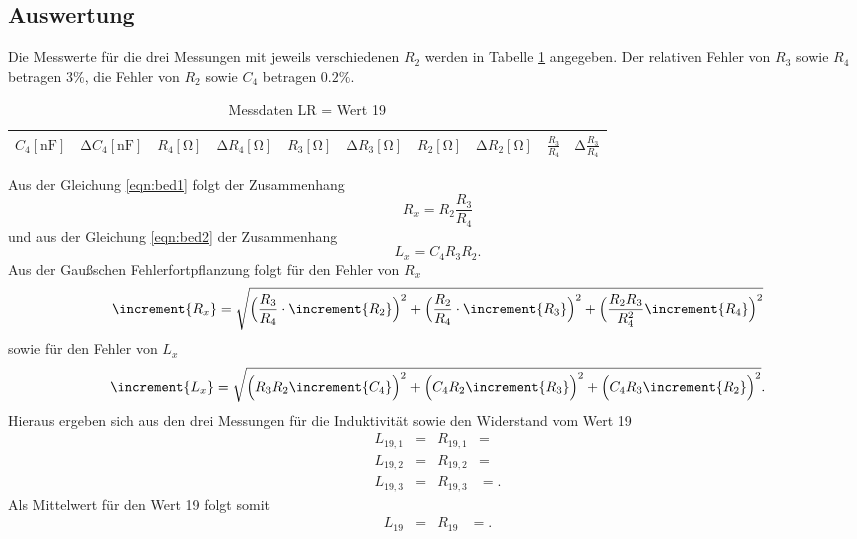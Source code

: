 \subsection{Auswertung}
Die Messwerte für die drei Messungen mit jeweils verschiedenen $R_2$ werden in Tabelle \ref{tab:7} angegeben.
Der relativen Fehler von $R_3$ sowie $R_4$ betragen $3\%$, die Fehler von $R_2$ sowie $C_4$ betragen $0.2\%$. \cite{sample}
\begin{table}
  \centering
  \caption{Messdaten LR = Wert 19}
  \label{tab:7}
  \begin{tabular}{c c c c c c c c c c}
    \toprule
    {$C_4 [\si{\nano\farad}]$} & {$\increment C_4 [\si{\nano\farad}]$} & {$R_4 [\si{\ohm}]$} & {$\increment R_4 [\si{\ohm}]$} & {$R_3 [\si{\ohm}]$} & {$\increment R_3 [\si{\ohm}]$} & {$R_2 [\si{\ohm}]$} & {$\increment R_2 [\si{\ohm}]$} & {$\frac{R_3}{R_4}$} & {$\increment \frac{R_3}{R_4}$} \\
    \midrule
    
    \bottomrule
  \end{tabular}
\end{table}
Aus der Gleichung \ref{eqn:bed1} folgt der Zusammenhang
\begin{equation}
  R_x = R_2 \frac{R_3}{R_4}
\end{equation}
und aus der Gleichung \ref{eqn:bed2} der Zusammenhang
\begin{equation}
  L_x = C_4R_3R_2.
\end{equation}
Aus der Gaußschen Fehlerfortpflanzung folgt für den Fehler von $R_x$
\begin{equation}
\increment{R_x} = \sqrt{\Bigl( \frac{R_3}{R_4} \cdot \increment{R_2} \Bigr)^2 + \Bigl( \frac{R_2}{R_4} \cdot \increment{R_3}\Bigr)^2 + \Bigl( \frac{R_2 R_3}{R_4^2} \increment{R_4} \Bigr)^2}
  \label{eqn:fehler1}
\end{equation}
sowie für den Fehler von $L_x$
\begin{equation}
\increment{L_x} = \sqrt{\Bigl( R_3 R_2 \increment{C_4} \Bigr)^2 + \Bigl( C_4 R_2 \increment{R_3} \Bigr)^2 + \Bigl( C_4 R_3 \increment{R_2} \Bigr)^2}.
  \label{eqn:fehler1}
\end{equation}
Hieraus ergeben sich aus den drei Messungen für die Induktivität sowie den Widerstand vom Wert 19
\begin{align*}
  L_{19,1}   &=  & R_{19,1} &= \\
  L_{19,2}   &=  & R_{19,2} &= \\
  L_{19,3}   &=  & R_{19,3} &= .
\end{align*}
Als Mittelwert für den Wert 19 folgt somit
\begin{align*}
  L_{19}   &=  & R_{19} &= .
\end{align*}

